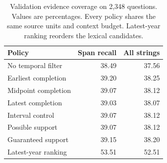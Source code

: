 \begin{table}[t]
\centering\small
\setlength{\tabcolsep}{4pt}
\begin{tabular}{@{}lrr@{}}
\toprule
Policy & Span recall & All strings\\
\midrule
No temporal filter & 38.49 & 37.56 \\
Earliest completion & 39.20 & 38.25 \\
Midpoint completion & 39.07 & 38.12 \\
Latest completion & 39.03 & 38.07 \\
Interval control & 39.07 & 38.12 \\
Possible support & 39.07 & 38.12 \\
Guaranteed support & 39.15 & 38.20 \\
Latest-year ranking & 53.51 & 52.51 \\
\bottomrule
\end{tabular}
\caption{Validation evidence coverage on 2,348 questions. Values are percentages. Every policy shares the same source units and context budget. Latest-year ranking reorders the lexical candidates.}
\label{tab:matched}
\end{table}
